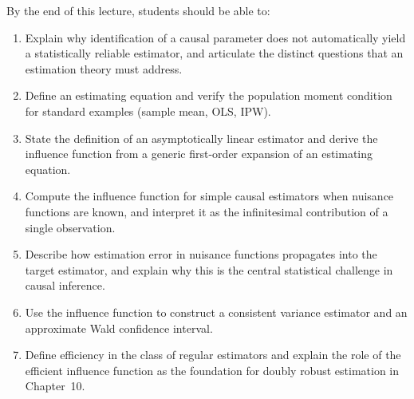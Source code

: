 \documentclass[master.tex]{subfiles}
\begin{document}

\begin{tcolorbox}[defstyle, title={Learning Objectives}]
By the end of this lecture, students should be able to:
\begin{enumerate}
  \item Explain why identification of a causal parameter does not
    automatically yield a statistically reliable estimator, and
    articulate the distinct questions that an estimation theory must
    address.
  \item Define an estimating equation and verify the population moment
    condition for standard examples (sample mean, OLS, IPW).
  \item State the definition of an asymptotically linear estimator and
    derive the influence function from a generic first-order expansion
    of an estimating equation.
  \item Compute the influence function for simple causal estimators when
    nuisance functions are known, and interpret it as the
    infinitesimal contribution of a single observation.
  \item Describe how estimation error in nuisance functions propagates
    into the target estimator, and explain why this is the central
    statistical challenge in causal inference.
  \item Use the influence function to construct a consistent variance
    estimator and an approximate Wald confidence interval.
  \item Define efficiency in the class of regular estimators and explain
    the role of the efficient influence function as the foundation for
    doubly robust estimation in Chapter~10.
\end{enumerate}
\end{tcolorbox}
\end{document}
